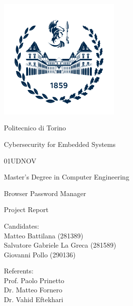 \documentclass[10pt,  english, makeidx, a4paper, titlepage, oneside]{book}
\begin{document}
\frontmatter
\begin{titlepage}
\vspace{0cm}
\centerline{
\includegraphics[width=6cm]{./logopolitonuovo}} 
\vspace{0.5cm}
\centerline{\LARGE Politecnico di Torino}
\vspace{2.5cm}
\centerline{\huge Cybersecurity for Embedded Systems}
\vspace{0.25cm}
\centerline{\huge 01UDNOV}
\vspace{1cm}
\centerline{\Large Master's Degree in Computer Engineering}
\vspace{2.5cm}
\centerline{\Huge Browser Password Manager}
\bigskip
\centerline{\huge Project Report}
\vspace{2cm}
\vfill
\begin{minipage}{9.5cm} %
\Large{Candidates:\\
Matteo Battilana (281389)\\
Salvatore Gabriele La Greca (281589) \\
Giovanni Pollo (290136)}
\end{minipage}
\hfill
\begin{minipage}{4.4cm}
\Large{Referents: \\
Prof. Paolo Prinetto\\
Dr. Matteo Fornero\\
Dr. Vahid Eftekhari}
\end{minipage}
\end{titlepage}

\tableofcontents
\listoffigures %
\listoftables %

\mainmatter
    










    

\appendix



\end{document}

